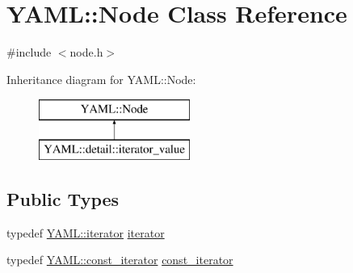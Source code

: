 \hypertarget{class_y_a_m_l_1_1_node}{}\section{Y\+A\+ML\+::Node Class Reference}
\label{class_y_a_m_l_1_1_node}


{\ttfamily \#include $<$node.\+h$>$}

Inheritance diagram for Y\+A\+ML\+::Node\+:\begin{figure}[H]
\begin{center}
\leavevmode
\includegraphics[height=2.000000cm]{class_y_a_m_l_1_1_node}
\end{center}
\end{figure}
\subsection*{Public Types}
\begin{DoxyCompactItemize}
\item 
typedef \mbox{\hyperlink{namespace_y_a_m_l_a057e57e7f23a1b85ea32bbc730b94d24}{Y\+A\+M\+L\+::iterator}} \mbox{\hyperlink{class_y_a_m_l_1_1_node_a3004302ddd5d977af0a6da29af38f7f4}{iterator}}
\item 
typedef \mbox{\hyperlink{namespace_y_a_m_l_a0a1f3211b4b1f42bb8e6a9fde49b5c44}{Y\+A\+M\+L\+::const\+\_\+iterator}} \mbox{\hyperlink{class_y_a_m_l_1_1_node_a40d235ac56001961929189a33c923d6c}{const\+\_\+iterator}}
\end{DoxyCompactItemize}
